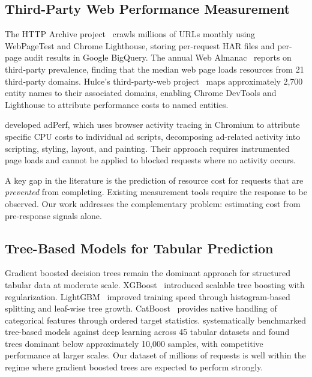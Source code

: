 \documentclass[11pt]{article}
\begin{document}
\subsection{Third-Party Web Performance Measurement}

The HTTP Archive project~\citep{httparchive} crawls millions of URLs monthly using WebPageTest and Chrome Lighthouse, storing per-request HAR files and per-page audit results in Google BigQuery. The annual Web Almanac~\citep{webalmanac2022} reports on third-party prevalence, finding that the median web page loads resources from 21 third-party domains. Hulce's third-party-web project~\citep{thirdpartyweb} maps approximately 2,700 entity names to their associated domains, enabling Chrome DevTools and Lighthouse to attribute performance costs to named entities.

\citet{pourghassemi2021adperf} developed adPerf, which uses browser activity tracing in Chromium to attribute specific CPU costs to individual ad scripts, decomposing ad-related activity into scripting, styling, layout, and painting. Their approach requires instrumented page loads and cannot be applied to blocked requests where no activity occurs.

A key gap in the literature is the prediction of resource cost for requests that are \emph{prevented} from completing. Existing measurement tools require the response to be observed. Our work addresses the complementary problem: estimating cost from pre-response signals alone.

\subsection{Tree-Based Models for Tabular Prediction}

Gradient boosted decision trees remain the dominant approach for structured tabular data at moderate scale. XGBoost~\citep{chen2016xgboost} introduced scalable tree boosting with regularization. LightGBM~\citep{ke2017lightgbm} improved training speed through histogram-based splitting and leaf-wise tree growth. CatBoost~\citep{prokhorenkova2018catboost} provides native handling of categorical features through ordered target statistics. \citet{grinsztajn2022tree} systematically benchmarked tree-based models against deep learning across 45 tabular datasets and found trees dominant below approximately 10,000 samples, with competitive performance at larger scales. Our dataset of millions of requests is well within the regime where gradient boosted trees are expected to perform strongly.
\end{document}
